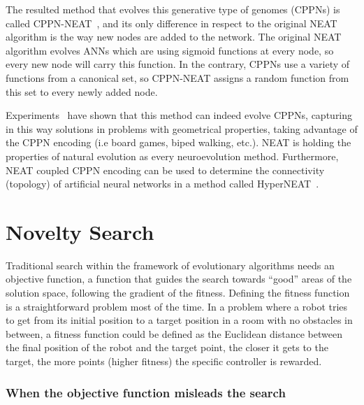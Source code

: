 The resulted method that evolves this generative type of genomes (CPPNs) is called CPPN-NEAT~\citep{stanley2007compositional}, and its only difference in respect to the original NEAT algorithm is the way new nodes are added to the network. The original NEAT algorithm evolves ANNs which are using sigmoid functions at every node, so every new node will carry this function.
In the contrary, CPPNs use a variety of functions from a canonical set, so CPPN-NEAT assigns a random function from this set to every newly added node. 

Experiments~\citep{stanley2007compositional} have shown that this method can indeed evolve CPPNs, capturing in this way solutions in problems with geometrical properties, taking advantage of the CPPN encoding (i.e board games, biped walking, etc.). NEAT is holding the properties of natural evolution as every neuroevolution method. Furthermore, NEAT coupled CPPN encoding can be used to determine the connectivity (topology) of artificial neural networks in  a method called HyperNEAT~\citep{stanley2009hypercube}.




\section{Novelty Search}
\label{NoveltySearch}

Traditional search within the framework of evolutionary algorithms needs an objective function, a function that guides the search towards ``good'' areas of the solution space, following the gradient of the fitness. Defining the fitness function is a straightforward problem most of the time. In a problem where a robot tries to get from its initial position to a target position in a room with no obstacles in between, a fitness function could be defined as the Euclidean distance between the final position of the robot and the target point, the closer it gets to the target, the more points (higher fitness) the specific controller is rewarded.

\subsubsection*{When the objective function misleads the search}

